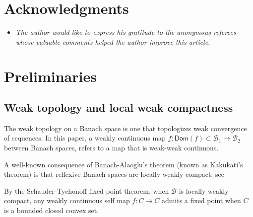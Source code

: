 \documentclass[a4, 12pt,leqno]{amsart}
\theoremstyle{plain}
\theoremstyle{definition}
\theoremstyle{remark}
\numberwithin{equation}{section}
\newcommand{\B}{\mathcal{B}}
\begin{document}
\section*{\small \bf  Acknowledgments}

\vspace{-175pt}

\begin{minipage}[c][7cm][b]{0.87\textwidth}
\renewcommand{\labelitemi}{\raisebox{1pt}{\scalebox{0.6}{\ding{169}}}}
	\begin{itemize}
		\item \textit{The author would like to express his gratitude to the anonymous referees whose valuable comments helped the author improve this article}. 
	\end{itemize}
\end{minipage}
\normalsize


\section{Preliminaries}\label{sec:prelim}
\subsection{Weak topology and local weak compactness}\label{subsec:wt}
The weak topology on a Banach space is one that topologizes weak convergence of sequences. In this paper, a weakly continuous map $f: \mathsf{Dom}(f)\subset \B_1 \to \B_2$ between Banach spaces, refers to a map that is weak-weak continuous. 
\par A well-known consequence of Banach-Alaoglu's theorem (known as Kakukati's theorem) is that reflexive Banach spaces are locally weakly compact; see~\cite[Theorem V.4.2]{Conw}
\par By the Schauder-Tychonoff fixed point theorem, when $\B$ is locally weakly compact, any weakly continuous self map $f: C \to C$ admits a fixed point when $C$ is a bounded closed convex set. 
\end{document}
